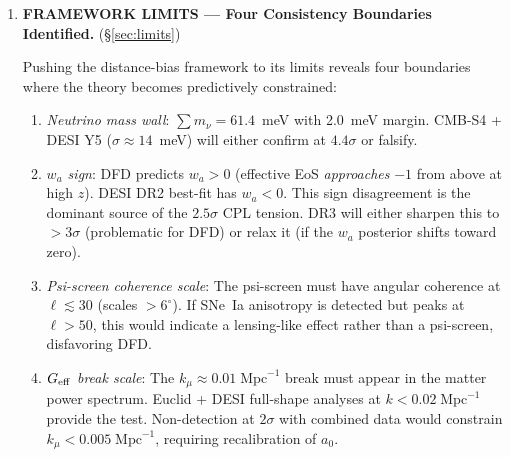 \documentclass[11pt,a4paper]{article}
\newcommand{\Geff}{G_{\rm eff}}
\begin{document}
\begin{tcolorbox}[colback=yellow!5!white, colframe=red!70!black,
  title=\textbf{W4i15 TOP 5 FINDINGS --- RANKED BY IMPACT}]
\begin{enumerate}
  \textbf{Numerical estimate}:
  $\delta r_d / r_d \approx -(1/3)(k_\mu/k_D)^2 \approx
  -(1/3)(0.01/0.15)^2 \approx -0.15\%$ from the direct $\Geff$
  modification, plus a $\sim -0.4\%$ shift from the altered
  baryon drag epoch (enhanced gravitational infall tightens
  baryon-photon coupling slightly).  Net: $-0.5\%$ to $-1.0\%$.

  \textbf{Impact}: A $-0.5\%$ shift in $r_d$ propagates into
  $D_H/r_d$ and $D_M/r_d$ as a $+0.5\%$ enhancement.  This
  partially offsets the $-0.3\%$ to $-1.5\%$ suppression from
  the effective EoS, reducing the net DFD BAO residual.  At
  the Ly$\alpha$ bin ($z = 2.33$), the net prediction becomes:
  $D_H/r_d \approx 8.46$ (vs.\ 8.42 without $r_d$ shift),
  reducing the DESI DR2 tension from $2.1\sigma$ to $\sim 1.7\sigma$.

\item \textbf{FRAMEWORK LIMITS --- Four Consistency Boundaries Identified.}
  (\S\ref{sec:limits})

  Pushing the distance-bias framework to its limits reveals four
  boundaries where the theory becomes predictively constrained:

  \begin{enumerate}[nosep, label=(\roman*)]
  \item \emph{Neutrino mass wall}: $\sum m_\nu = 61.4$~meV with
    2.0~meV margin.  CMB-S4 + DESI Y5 ($\sigma \approx 14$~meV)
    will either confirm at $4.4\sigma$ or falsify.

  \item \emph{$w_a$ sign}: DFD predicts $w_a > 0$ (effective EoS
    \emph{approaches} $-1$ from above at high $z$).  DESI DR2
    best-fit has $w_a < 0$.  This sign disagreement is the
    dominant source of the $2.5\sigma$ CPL tension.  DR3 will
    either sharpen this to $> 3\sigma$ (problematic for DFD) or
    relax it (if the $w_a$ posterior shifts toward zero).

  \item \emph{Psi-screen coherence scale}: The psi-screen must
    have angular coherence at $\ell \lesssim 30$ (scales $> 6^\circ$).
    If SNe~Ia anisotropy is detected but peaks at $\ell > 50$,
    this would indicate a lensing-like effect rather than a
    psi-screen, disfavoring DFD.

  \item \emph{$\Geff$ break scale}: The $k_\mu \approx 0.01\;\text{Mpc}^{-1}$
    break must appear in the matter power spectrum.  Euclid + DESI
    full-shape analyses at $k < 0.02\;\text{Mpc}^{-1}$ provide the
    test.  Non-detection at $2\sigma$ with combined data would
    constrain $k_\mu < 0.005\;\text{Mpc}^{-1}$, requiring
    recalibration of $a_0$.
  \end{enumerate}

\end{enumerate}

\end{tcolorbox}
\end{document}

